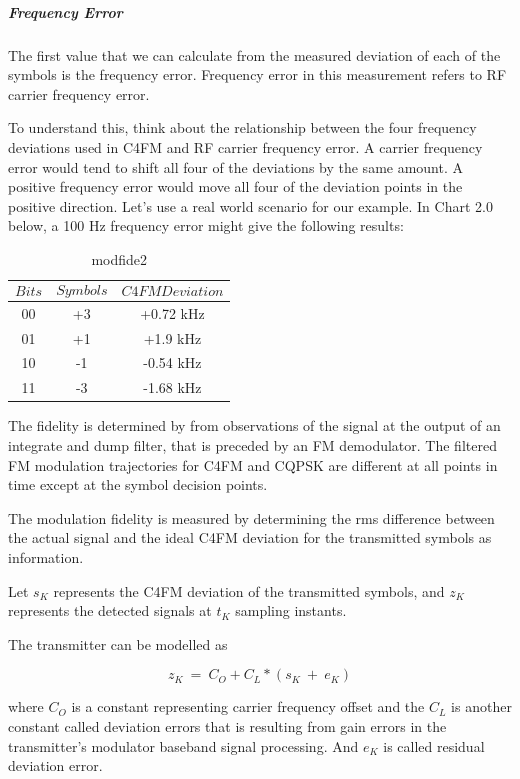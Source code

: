 \subparagraph{Frequency Error}
\- \indent
	The first value that we can calculate from the measured deviation of each of the symbols is the frequency error. Frequency error in this measurement refers to RF carrier frequency error.
		
	To understand this, think about the relationship between the four frequency deviations used in C4FM and RF carrier frequency error. A carrier frequency error would tend to shift all four of the deviations by the same amount. A positive frequency error would move all four of the deviation points in the positive direction. Let’s use a real world scenario for our example. In Chart 2.0 below, a 100 Hz frequency error might give the following results:


\begin{table}[H]
  \centering
 
    \begin{tabular}{c|c|c}
       $$Bits$$ & $$Symbols$$ & $$C4FM Deviation$$ \\ \hline
       00 & +3 & +0.72 kHz  \\ \hline
       01 & +1 & +1.9 kHz  \\ \hline
       10 & -1 & -0.54 kHz  \\ \hline
       11 & -3 & -1.68 kHz  
      
  \end{tabular}
  \caption{modfide2}
  \label{tab:modfide2}
\end{table}

	The fidelity is determined by from observations of the signal at the output of an integrate and dump filter, that is preceded by an FM demodulator. The filtered FM modulation trajectories for C4FM and CQPSK are different at all points in time except at the symbol decision points.
	
	The modulation fidelity is measured by determining the rms difference between the actual signal and the ideal C4FM deviation for the transmitted symbols as information.
	
	Let $s_K$ represents the C4FM deviation of the transmitted symbols, and $z_K$ represents the detected signals at $t_K$ sampling instants.
	
	The transmitter can be modelled as
	
	$$ z_K~=~C_O+C_L*(s_K~+~e_K) $$
	
	where $C_O$ is a constant representing carrier frequency offset and the $C_L$ is another constant called deviation errors that is resulting from gain errors in the transmitter's modulator baseband signal processing. And $e_K$ is called residual deviation error.
	
